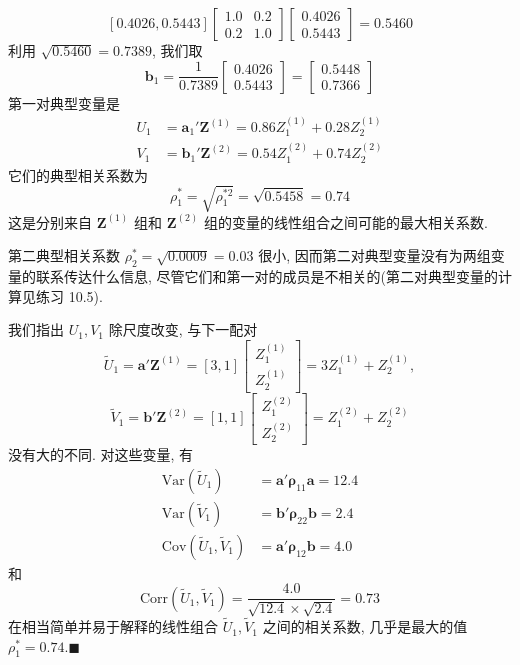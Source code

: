 
\[
[0.4026,0.5443]\begin{bmatrix}1.0 & 0.2\\ 0.2 & 1.0\end{bmatrix}\begin{bmatrix}0.4026\\0.5443\end{bmatrix}=0.5460
\]
利用 $\sqrt{0.5460}=0.7389$, 我们取
\[
\mathbf{b}_1=\frac{1}{0.7389}\begin{bmatrix}0.4026\\0.5443\end{bmatrix}=\begin{bmatrix}0.5448\\0.7366\end{bmatrix}
\]
第一对典型变量是
\[
\begin{aligned}
U_1&=\mathbf{a}_1'\mathbf{Z}^{(1)}=0.86Z_1^{(1)}+0.28Z_2^{(1)}\\
V_1&=\mathbf{b}_1'\mathbf{Z}^{(2)}=0.54Z_1^{(2)}+0.74Z_2^{(2)}
\end{aligned}
\]
它们的典型相关系数为
\[
\rho_1^*=\sqrt{\rho_1^{*2}}=\sqrt{0.5458}=0.74
\]
这是分别来自 $\mathbf{Z}^{(1)}$ 组和 $\mathbf{Z}^{(2)}$ 组的变量的线性组合之间可能的最大相关系数.

第二典型相关系数 $\rho_2^*=\sqrt{0.0009}=0.03$ 很小, 因而第二对典型变量没有为两组变量的联系传达什么信息, 尽管它们和第一对的成员是不相关的(第二对典型变量的计算见练习 10.5).

我们指出 $U_1,V_1$ 除尺度改变, 与下一配对
\[
\widetilde{U}_1=\mathbf{a}'\mathbf{Z}^{(1)}=[3,1]\begin{bmatrix}Z_1^{(1)}\\Z_2^{(1)}\end{bmatrix}=3Z_1^{(1)}+Z_2^{(1)},
\]
\[
\widetilde{V}_1=\mathbf{b}'\mathbf{Z}^{(2)}=[1,1]\begin{bmatrix}Z_1^{(2)}\\Z_2^{(2)}\end{bmatrix}=Z_1^{(2)}+Z_2^{(2)}
\]
没有大的不同. 对这些变量, 有
\[
\begin{aligned}
\mathrm{Var}(\widetilde{U}_1)&=\mathbf{a}'\boldsymbol{\rho}_{11}\mathbf{a}=12.4\\
\mathrm{Var}(\widetilde{V}_1)&=\mathbf{b}'\boldsymbol{\rho}_{22}\mathbf{b}=2.4\\
\mathrm{Cov}(\widetilde{U}_1,\widetilde{V}_1)&=\mathbf{a}'\boldsymbol{\rho}_{12}\mathbf{b}=4.0
\end{aligned}
\]
和
\[
\mathrm{Corr}(\widetilde{U}_1,\widetilde{V}_1)=\frac{4.0}{\sqrt{12.4}\times\sqrt{2.4}}=0.73
\]
在相当简单并易于解释的线性组合 $\widetilde{U}_1,\widetilde{V}_1$ 之间的相关系数, 几乎是最大的值 $\rho_1^*=0.74$.\hfill$\blacksquare$

